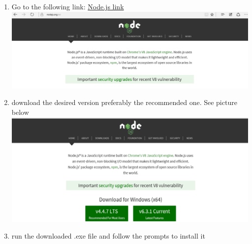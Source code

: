\documentclass[a4paper,12pt]{article}
\begin{document}
\begin{enumerate}
\item Go to the following link: \href{https://nodejs.org/en/}{Node.js link}\\[0.2cm]
\includegraphics[width=0.9\linewidth, center]{./Installation/nodejs_website.PNG}\\[0.4cm] 
 
\item download the desired version preferably the recommended one. See picture below \\
\includegraphics[width=0.9\linewidth, center]{./Installation/nodejs.PNG}\\[0.4cm] 
 
\item run the downloaded .exe file and follow the prompts to install it\\
\end{enumerate}
\end{document}
